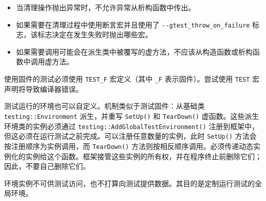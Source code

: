 \begin{itemize}
\item
当清理操作抛出异常时，不允许异常从析构函数中传出。

\item
如果需要在清理过程中使用断言宏并且使用了 \verb|--gtest_throw_on_failure| 标志，该标志决定在发生失败时抛出哪些宏。

\item
如果需要调用可能会在派生类中被覆写的虚方法，不应该从构造函数或析构函数中调用虚方法。
\end{itemize}

使用固件的测试必须使用 \verb|TEST_F| 宏定义（其中 \verb|_F| 表示固件）。尝试使用 \verb|TEST| 宏声明将导致编译器错误。

测试运行的环境也可以自定义。机制类似于测试固件：从基础类 \verb|testing::Environment| 派生，并重写 \verb|SetUp()| 和 \verb|TearDown()| 虚函数。这些派生环境类的实例必须通过 \verb|testing::AddGlobalTestEnvironment()| 注册到框架中，但这必须在运行测试之前完成。可以注册任意数量的实例，此时 \verb|SetUp()| 方法会按注册顺序为实例调用，而 \verb|TearDown()| 方法则按相反顺序调用。必须传递动态实例化的实例给这个函数。框架接管这些实例的所有权，并在程序终止前删除它们；因此，不要自己删除它们。

环境实例不可供测试访问，也不打算向测试提供数据。其目的是定制运行测试的全局环境。


